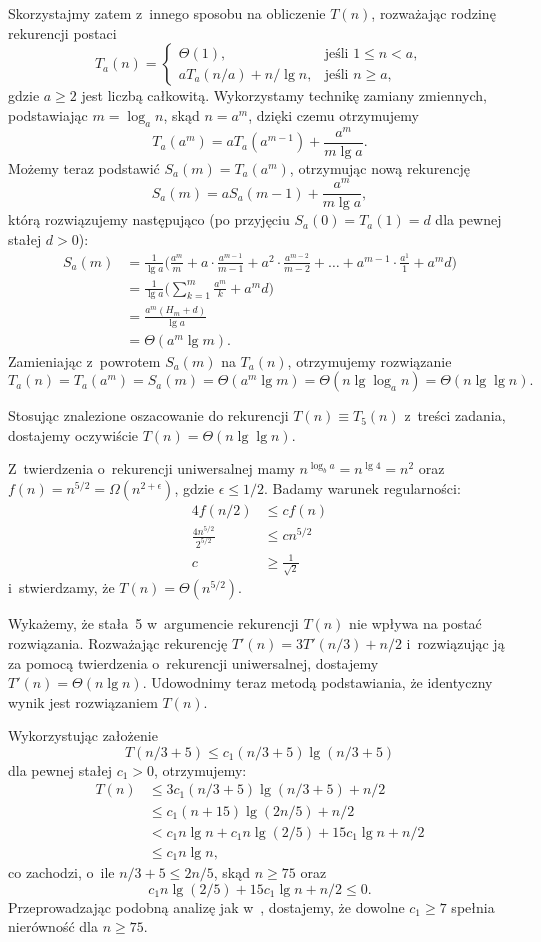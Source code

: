 Skorzystajmy zatem z~innego sposobu na obliczenie $T(n)$, rozważając rodzinę rekurencji postaci
\[
	T_a(n) = \begin{cases}
		\Theta(1), & \text{jeśli $1\le n<a$}, \\
		aT_a(n/a)+n/\!\lg n, & \text{jeśli $n\ge a$},
	\end{cases}
\]
gdzie $a\ge2$ jest liczbą całkowitą. Wykorzystamy technikę zamiany zmiennych, podstawiając $m=\log_an$, skąd $n=a^m$, dzięki czemu otrzymujemy
\[
	T_a(a^m) = aT_a(a^{m-1})+\frac{a^m}{m\lg a}.
\]
Możemy teraz podstawić $S_a(m)=T_a(a^m)$, otrzymując nową rekurencję
\[
	S_a(m) = aS_a(m-1)+\frac{a^m}{m\lg a},
\]
którą rozwiązujemy następująco (po przyjęciu $S_a(0)=T_a(1)=d$ dla pewnej stałej $d>0$):
\begin{align*}
	S_a(m) &= \frac{1}{\lg a}\biggl(\frac{a^m}{m}+a\cdot\frac{a^{m-1}}{m-1}+a^2\cdot\frac{a^{m-2}}{m-2}+\dots+a^{m-1}\cdot\frac{a^1}{1}+a^md\biggr) \\[1mm]
	&= \frac{1}{\lg a}\biggl(\sum_{k=1}^m\frac{a^m}{k}+a^md\biggr) \\[1mm]
	&= \frac{a^m(H_m+d)}{\lg a} \\[1mm]
	&= \Theta(a^m\lg m).
\end{align*}
Zamieniając z~powrotem $S_a(m)$ na $T_a(n)$, otrzymujemy rozwiązanie
\[
	T_a(n) = T_a(a^m) = S_a(m) = \Theta(a^m\lg m) = \Theta(n\lg\log_a n) = \Theta(n\lg\lg n).
\]

Stosując znalezione oszacowanie do rekurencji $T(n)\equiv T_5(n)$ z~treści zadania, dostajemy oczywiście $T(n)=\Theta(n\lg\lg n)$.

\subproblem %
Z~twierdzenia o~rekurencji uniwersalnej mamy $n^{\log_ba}=n^{\lg4}=n^2$ oraz $f(n)=n^{5/2}=\Omega(n^{2+\epsilon})$, gdzie $\epsilon\le1/2$. Badamy warunek regularności:
\begin{align*}
	4f(n/2) &\le cf(n) \\
	\frac{4n^{5/2}}{2^{5/2}} &\le cn^{5/2} \\
	c &\ge \frac{1}{\sqrt{2}}
\end{align*}
i~stwierdzamy, że $T(n)=\Theta(n^{5/2})$.

\subproblem %
Wykażemy, że stała~5 w~argumencie rekurencji $T(n)$ nie wpływa na postać rozwiązania. Rozważając rekurencję $T'(n)=3T'(n/3)+n/2$ i~rozwiązując ją za pomocą twierdzenia o~rekurencji uniwersalnej, dostajemy $T'(n)=\Theta(n\lg n)$. Udowodnimy teraz metodą podstawiania, że identyczny wynik jest rozwiązaniem $T(n)$.

Wykorzystując założenie
\[
	T(n/3+5) \le c_1(n/3+5)\lg(n/3+5)
\]
dla pewnej stałej $c_1>0$, otrzymujemy:
\begin{align*}
	T(n) &\le 3c_1(n/3+5)\lg(n/3+5)+n/2 \\
	&\le c_1(n+15)\lg(2n/5)+n/2 \\
	&< c_1n\lg n+c_1n\lg(2/5)+15c_1\!\lg n+n/2 \\
	&\le c_1n\lg n,
\end{align*}
co zachodzi, o~ile $n/3+5\le2n/5$, skąd $n\ge75$ oraz
\[
	c_1n\lg(2/5)+15c_1\!\lg n+n/2 \le 0.
\]
Przeprowadzając podobną analizę jak w~, dostajemy, że dowolne $c_1\ge7$ spełnia nierówność dla $n\ge75$.

